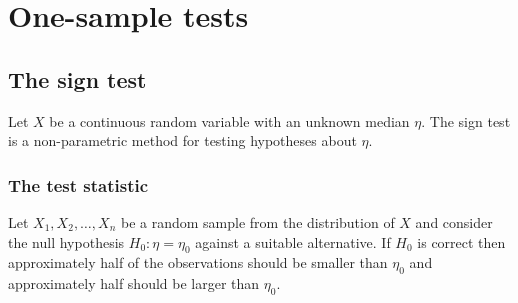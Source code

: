 
\section{One-sample tests}\label{sec:np_one_sample_tests}

\subsection{The sign test}\label{sec:signtest}

Let $X$ be a continuous random variable with an unknown median $\eta$. The sign test is a non-parametric method for testing hypotheses about $\eta$.

%
%

\subsubsection{The test statistic}

Let $X_1,X_2,\ldots,X_n$ be a random sample from the distribution of $X$ and consider the null hypothesis $H_0:\eta=\eta_0$ against a suitable alternative. If $H_0$ is correct then approximately half of the observations should be smaller than $\eta_0$ and approximately half should be larger than $\eta_0$.

